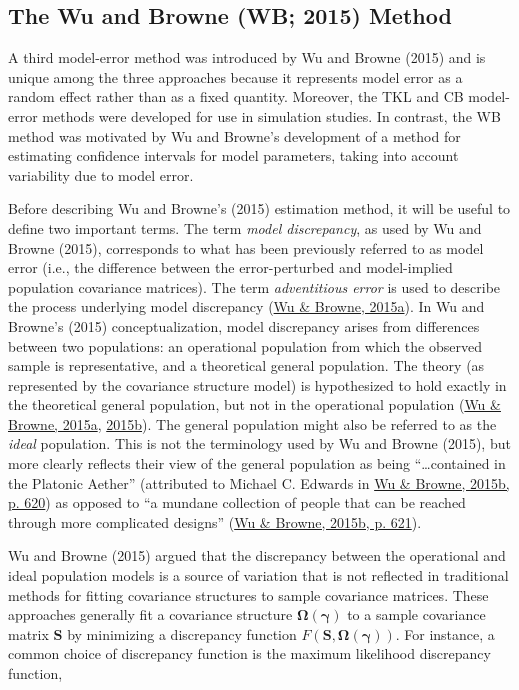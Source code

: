 \documentclass[11pt]{umnthesis}
\begin{document}
\hypertarget{the-wu-and-browne-wb-2015-method}{%
\subsection{The Wu and Browne (WB; 2015) Method}\label{the-wu-and-browne-wb-2015-method}}

A third model-error method was introduced by Wu and Browne (2015) and is unique among the three approaches because it represents model error as a random effect rather than as a fixed quantity. Moreover, the TKL and CB model-error methods were developed for use in simulation studies. In contrast, the WB method was motivated by Wu and Browne's development of a method for estimating confidence intervals for model parameters, taking into account variability due to model error.

Before describing Wu and Browne's (2015) estimation method, it will be useful to define two important terms. The term \emph{model discrepancy}, as used by Wu and Browne (2015), corresponds to what has been previously referred to as model error (i.e., the difference between the error-perturbed and model-implied population covariance matrices). The term \emph{adventitious error} is used to describe the process underlying model discrepancy (\protect\hyperlink{ref-wu2015}{Wu \& Browne, 2015a}). In Wu and Browne's (2015) conceptualization, model discrepancy arises from differences between two populations: an operational population from which the observed sample is representative, and a theoretical general population. The theory (as represented by the covariance structure model) is hypothesized to hold exactly in the theoretical general population, but not in the operational population (\protect\hyperlink{ref-wu2015}{Wu \& Browne, 2015a}, \protect\hyperlink{ref-wu2015a}{2015b}). The general population might also be referred to as the \emph{ideal} population. This is not the terminology used by Wu and Browne (2015), but more clearly reflects their view of the general population as being ``\ldots contained in the Platonic Aether'' (attributed to Michael C. Edwards in \protect\hyperlink{ref-wu2015a}{Wu \& Browne, 2015b, p. 620}) as opposed to ``a mundane collection of people that can be reached through more complicated designs'' (\protect\hyperlink{ref-wu2015a}{Wu \& Browne, 2015b, p. 621}).

Wu and Browne (2015) argued that the discrepancy between the operational and ideal population models is a source of variation that is not reflected in traditional methods for fitting covariance structures to sample covariance matrices. These approaches generally fit a covariance structure \(\bm{\Omega}(\bm{\gamma})\) to a sample covariance matrix \(\mathbf{S}\) by minimizing a discrepancy function \(F(\mathbf{S}, \bm{\Omega}(\bm{\gamma}))\). For instance, a common choice of discrepancy function is the maximum likelihood discrepancy function,
\end{document}
